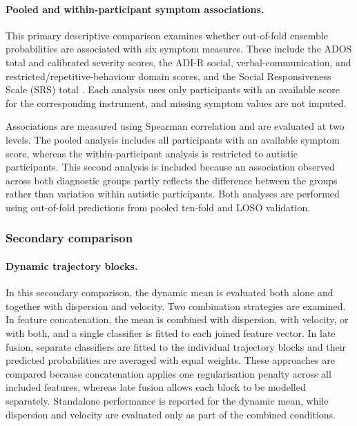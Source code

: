 \paragraph{\textbf{Pooled and within-participant symptom associations.}}
\label{par:symptom-associations}
This primary descriptive comparison examines whether out-of-fold ensemble probabilities are associated with six symptom measures. These include the ADOS total and calibrated severity scores, the ADI-R social, verbal-communication, and restricted/repetitive-behaviour domain scores, and the Social Responsiveness Scale (SRS) total \citep{Lordetal1994}. Each analysis uses only participants with an available score for the corresponding instrument, and missing symptom values are not imputed.

Associations are measured using Spearman correlation and are evaluated at two levels. The pooled analysis includes all participants with an available symptom score, whereas the within-participant analysis is restricted to autistic participants. This second analysis is included because an association observed across both diagnostic groups partly reflects the difference between the groups rather than variation within autistic participants. Both analyses are performed using out-of-fold predictions from pooled ten-fold and LOSO validation.



\subsubsection{Secondary comparison}
\label{subsubsec:secondary-comparisons}

\paragraph{\textbf{Dynamic trajectory blocks.}}
\label{par:trajectory-blocks}
In this secondary comparison, the dynamic mean is evaluated both alone and together with dispersion and velocity. Two combination strategies are examined. In feature concatenation, the mean is combined with dispersion, with velocity, or with both, and a single classifier is fitted to each joined feature vector. In late fusion, separate classifiers are fitted to the individual trajectory blocks and their predicted probabilities are averaged with equal weights. These approaches are compared because concatenation applies one regularisation penalty across all included features, whereas late fusion allows each block to be modelled separately. Standalone performance is reported for the dynamic mean, while dispersion and velocity are evaluated only as part of the combined conditions.

